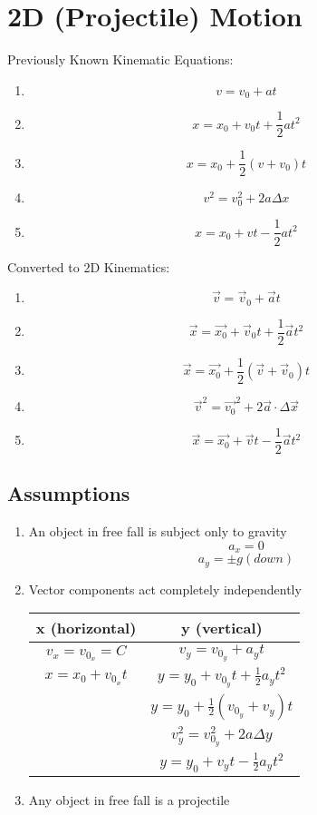 \documentclass{article}
\begin{document}
\section{2D (Projectile) Motion}

Previously Known Kinematic Equations:
\begin{enumerate}
	\item
		$$ v = v_0 + at $$
	\item
		$$ x = x_0 + v_0t + \frac{1}{2}at^2 $$
	\item
		$$ x = x_0 + \frac{1}{2}(v + v_0)t $$
	\item
		$$ v^2 = v_0^2 + 2a\Delta x $$
	\item
		$$ x = x_0 + vt - \frac{1}{2}at^2 $$
\end{enumerate}

Converted to 2D Kinematics:
\begin{enumerate}
	\item
		$$ \vec{v} = \vec{v}_0 + \vec{a}t $$
	\item
		$$ \vec{x} = \vec{x_0} + \vec{v}_0t + \frac{1}{2}\vec{a}t^2 $$
	\item
		$$ \vec{x} = \vec{x_0} + \frac{1}{2}(\vec{v} + \vec{v}_0)t $$
	\item
		$$ \vec{v}^2 = \vec{v_0}^2 + 2\vec{a} \cdot \Delta \vec{x} $$
	\item
		$$ \vec{x} = \vec{x_0} + \vec{v}t - \frac{1}{2}\vec{a}t^2 $$
\end{enumerate}

\subsection{Assumptions}

\begin{enumerate}
	\item
		An object in free fall is subject only to gravity
		$$ a_x = 0 $$
		$$ a_y = \pm g (down) $$
	\item
		Vector components act completely independently

		\begin{tabular}{ c | c }
			\textbf{x (horizontal)} & \textbf{y (vertical)} \\
			\hline
			$ v_x = v_{0_x} = C $ & $ v_y = v_{0_y} + a_yt $ \\
			$ x = x_0 + v_{0_x}t $ & $ y = y_0 + v_{0_y}t + \frac{1}{2}a_yt^2 $ \\
									  & $ y = y_0 + \frac{1}{2}(v_{0_y} + v_y)t $ \\
									  & $ v_y^2 = v_{0_y}^2 + 2a\Delta y $ \\
									  & $ y = y_0 + v_yt - \frac{1}{2}a_yt^2 $
		\end{tabular}
	\item
		Any object in free fall is a projectile
\end{enumerate}
\end{document}
